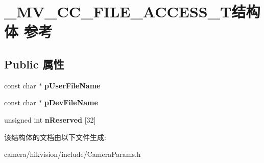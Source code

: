\hypertarget{struct___m_v___c_c___f_i_l_e___a_c_c_e_s_s___t}{}\section{\+\_\+\+M\+V\+\_\+\+C\+C\+\_\+\+F\+I\+L\+E\+\_\+\+A\+C\+C\+E\+S\+S\+\_\+\+T结构体 参考}
\label{struct___m_v___c_c___f_i_l_e___a_c_c_e_s_s___t}
\subsection*{Public 属性}
\begin{DoxyCompactItemize}
\item 
\mbox{\label{struct___m_v___c_c___f_i_l_e___a_c_c_e_s_s___t_a8694e31af0485f2748225fa9745695b9}} 
const char $\ast$ {\bfseries p\+User\+File\+Name}
\item 
\mbox{\label{struct___m_v___c_c___f_i_l_e___a_c_c_e_s_s___t_af85cecdee47fb021aac43f293e490d8e}} 
const char $\ast$ {\bfseries p\+Dev\+File\+Name}
\item 
\mbox{\label{struct___m_v___c_c___f_i_l_e___a_c_c_e_s_s___t_aac8deb3d232d6d1056dcd9b1d1d9eeaf}} 
unsigned int {\bfseries n\+Reserved} \mbox{[}32\mbox{]}
\end{DoxyCompactItemize}


该结构体的文档由以下文件生成\+:\begin{DoxyCompactItemize}
\item 
camera/hikvision/include/Camera\+Params.\+h\end{DoxyCompactItemize}
